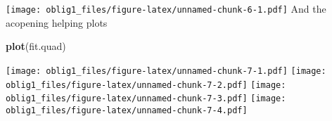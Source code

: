 \documentclass[
]{article}
\newenvironment{Shaded}{\begin{snugshade}}{\end{snugshade}}
\newcommand{\KeywordTok}[1]{\textcolor[rgb]{0.13,0.29,0.53}{\textbf{#1}}}
\newcommand{\NormalTok}[1]{#1}
\begin{document}
\texttt{[image: oblig1\_files/figure-latex/unnamed-chunk-6-1.pdf]} And
the acopening helping plots

\begin{Shaded}
\begin{Highlighting}[]
\KeywordTok{plot}\NormalTok{(fit.quad)}
\end{Highlighting}
\end{Shaded}

\texttt{[image: oblig1\_files/figure-latex/unnamed-chunk-7-1.pdf]}
\texttt{[image: oblig1\_files/figure-latex/unnamed-chunk-7-2.pdf]}
\texttt{[image: oblig1\_files/figure-latex/unnamed-chunk-7-3.pdf]}
\texttt{[image: oblig1\_files/figure-latex/unnamed-chunk-7-4.pdf]}
\end{document}
